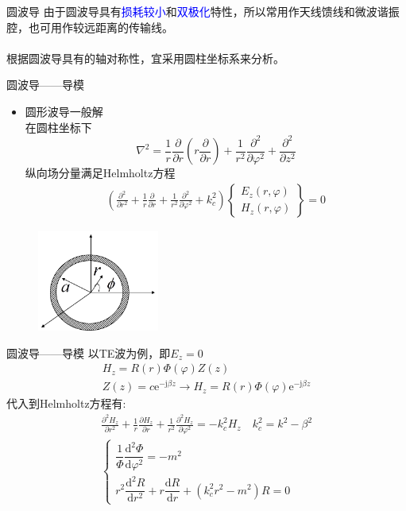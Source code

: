 \begin{frame}{圆波导}
    由于圆波导具有\textcolor{blue}{损耗较小}和\textcolor{blue}{双极化}特性，所以常用作天线馈线和微波谐振腔，也可用作较远距离的传输线。\\
    \hspace*{\fill}\\
    根据圆波导具有的轴对称性，宜采用圆柱坐标系来分析。
\end{frame}

\begin{frame}{圆波导——导模}
    \begin{itemize}
        \item 圆形波导一般解\\
              在圆柱坐标下\\
              $$\nabla^2=\frac{1}{r}\frac{\partial}{\partial r}\left(r\frac{\partial}{\partial r}\right)+\frac{1}{r^2}\frac{\partial^2}{\partial\varphi^2}+\frac{\partial^2}{\partial z^2}$$
              纵向场分量满足Helmholtz方程
              \begin{align*}
                  \left(\frac{\partial^2}{\partial r^2}+\frac{1}{r}\frac{\partial}{\partial r}+\frac{1}{r^2}\frac{\partial^2}{\partial\varphi^2}+k_c^2\right)\left\{\begin{matrix*}E_z(r,\varphi)\\H_z(r,\varphi)\end{matrix*}\right\}=0
              \end{align*}
    \end{itemize}
    \begin{figure}
        \includegraphics[width=4cm]{Cha6//fig6-18.png}
    \end{figure}
\end{frame}

\begin{frame}{圆波导——导模}
    以TE波为例，即$E_z=0$
    \begin{gather*}
        H_z=R(r)\Phi(\varphi)Z(z)\\
        Z(z)=c\mathrm{e}^{-\mathrm{j}\beta z}\rightarrow H_z=R(r)\Phi(\varphi)\mathrm{e}^{-\mathrm{j}\beta z}
    \end{gather*}
    代入到Helmholtz方程有:
    \begin{gather*}
        \frac{\partial^2H_z}{\partial r^2}+\frac{1}{r}\frac{\partial H_z}{\partial r}+\frac{1}{r^2}\frac{\partial^2H_z}{\partial\varphi^2}=-k_c^2H_z\quad k_c^2=k^2-\beta^2\\
        \begin{cases}
            \dfrac{1}{\Phi}\dfrac{\mathrm{d}^2\Phi}{\mathrm{d}\varphi^2}=-m^2 \\
            r^2\dfrac{\mathrm{d}^2R}{\mathrm{d}r^2}+r\dfrac{\mathrm{d}R}{\mathrm{d}r}+(k_c^2r^2-m^2)R=0
        \end{cases}
    \end{gather*}
\end{frame}

